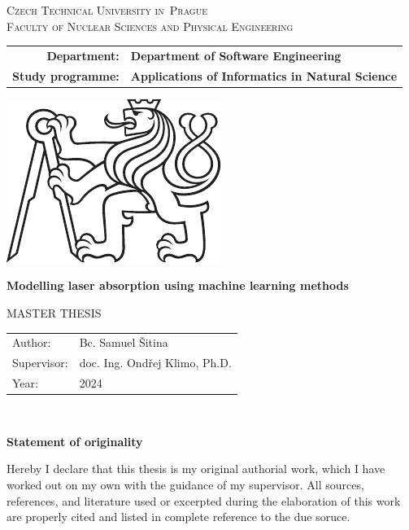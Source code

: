 \documentclass[a4paper,oneside,12pt]{book}
\newcommand{\tb}{\textbf} %
\newcommand{\cvut}{Czech Technical University in~Prague}
\newcommand{\fjfi}{Faculty of Nuclear Sciences and Physical Engineering}
\newcommand{\katedra}{Department of Software Engineering}
\newcommand{\program}{Applications of Informatics in Natural Science} %
\newcommand{\druh}{Master thesis} %
\newcommand{\logoCVUT}{\includegraphics{symbol_cvut_konturova_verze_cb.pdf}} %
\newcommand{\nazeven}{Modelling laser absorption using machine learning methods}          %
\newcommand{\autor}{Bc. Samuel Šitina}   %
\newcommand{\vedouci}{doc. Ing. Ondřej Klimo, Ph.D.} %
\newcommand{\rok}{2024}  %
\newcommand{\kde}{Praze} %
\newcommand{\prohlaseni}{Hereby I declare that this thesis is my original authorial work, which I have worked out on my own with the guidance of my supervisor. All sources, references, and literature used or excerpted during the elaboration of this work are properly cited and listed in complete reference to the due soruce.}
\begin{document}
\thispagestyle{empty}

\begin{center}
    {\Large \textsc{\cvut}\\[4mm] \textsc{\fjfi}}\par
    \vspace{4mm}

    \begin{tabular}{rl}
		\tb{Department:} & \tb{\katedra}\\
		\tb{Study programme:} & \tb{\program}\\
    \end{tabular}

   \vspace{10mm} \logoCVUT \vspace{15mm} 

   {\huge \tb{\nazeven}\par}
   \vspace{5mm}
   
   \vspace{15mm}
   {\Large \MakeUppercase{\druh}}

   \vfill
   {\large
    \begin{tabular}{ll}
  	Author: & \autor\\
   	Supervisor: & \vedouci\\
   	Year: & \rok
    \end{tabular}
   }
\end{center}

\newpage  %
\thispagestyle{empty} %



\newpage %
\thispagestyle{empty}  %

~ %
\vfill %

\tb{Statement of originality}

\vspace{1em} %
\prohlaseni
\end{document}
